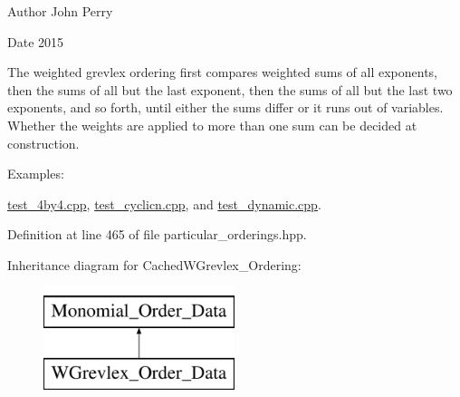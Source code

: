 \begin{DoxyAuthor}{Author}
John Perry 
\end{DoxyAuthor}
\begin{DoxyDate}{Date}
2015
\end{DoxyDate}
The weighted grevlex ordering first compares weighted sums of all exponents, then the sums of all but the last exponent, then the sums of all but the last two exponents, and so forth, until either the sums differ or it runs out of variables. Whether the weights are applied to more than one sum can be decided at construction. \begin{Desc}
\item[Examples\+: ]\par
\hyperlink{test_4by4_8cpp-example}{test\+\_\+4by4.\+cpp}, \hyperlink{test_cyclicn_8cpp-example}{test\+\_\+cyclicn.\+cpp}, and \hyperlink{test_dynamic_8cpp-example}{test\+\_\+dynamic.\+cpp}.\end{Desc}


Definition at line 465 of file particular\+\_\+orderings.\+hpp.

Inheritance diagram for Cached\+W\+Grevlex\+\_\+\+Ordering\+:\begin{figure}[H]
\begin{center}
\leavevmode
\includegraphics[height=3.000000cm]{group__orderinggroup}
\end{center}
\end{figure}
